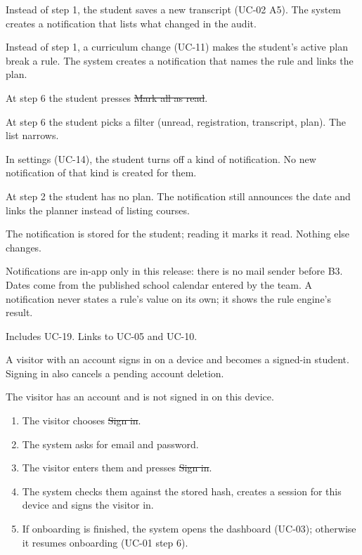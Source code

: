 \begin{altflows}
  \item[A1. Transcript changed.] Instead of step 1, the student saves a new transcript (UC-02 A5). The system creates a
        notification that lists what changed in the audit.
  \item[A2. Plan now breaks a rule.] Instead of step 1, a curriculum change (UC-11) makes the student's active plan break a
        rule. The system creates a notification that names the rule and links the plan.
  \item[A3. Mark all read.] At step 6 the student presses \st{Mark all as read}.
  \item[A4. Filter.] At step 6 the student picks a filter (unread, registration, transcript, plan). The list narrows.
  \item[A5. Turn a kind off.] In settings (UC-14), the student turns off a kind of notification. No new notification of
        that kind is created for them.
  \item[A6. Nothing applies.] At step 2 the student has no plan. The notification still announces the date and links the
        planner instead of listing courses.
\end{altflows}

The notification is stored for the student; reading it marks it read. Nothing else changes.

Notifications are in-app only in this release: there is no mail sender before B3. Dates come from the published school
calendar entered by the team. A notification never states a rule's value on its own; it shows the rule engine's result.

Includes UC-19. Links to UC-05 and UC-10.


A visitor with an account signs in on a device and becomes a signed-in student. Signing in also cancels a pending account
deletion.

The visitor has an account and is not signed in on this device.

\begin{enumerate}
  \item The visitor chooses \st{Sign in}.
  \item The system asks for email and password.
  \item The visitor enters them and presses \st{Sign in}.
  \item The system checks them against the stored hash, creates a session for this device and signs the visitor in.
  \item If onboarding is finished, the system opens the dashboard (UC-03); otherwise it resumes onboarding (UC-01 step 6).
\end{enumerate}

